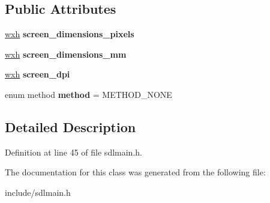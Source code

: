 \subsection*{Public Attributes}
\begin{DoxyCompactItemize}
\item 
\hypertarget{classScreenSizeInfo_ac42ff4475e23dbf92bca2c0ea9d2603b}{\hyperlink{structScreenSizeInfo_1_1wxh}{wxh} {\bfseries screen\-\_\-dimensions\-\_\-pixels}}\label{classScreenSizeInfo_ac42ff4475e23dbf92bca2c0ea9d2603b}

\item 
\hypertarget{classScreenSizeInfo_afe19e45bf6dd0785c5b4bd7db2f57570}{\hyperlink{structScreenSizeInfo_1_1wxh}{wxh} {\bfseries screen\-\_\-dimensions\-\_\-mm}}\label{classScreenSizeInfo_afe19e45bf6dd0785c5b4bd7db2f57570}

\item 
\hypertarget{classScreenSizeInfo_a5e130e26e512ad843178a620246efcde}{\hyperlink{structScreenSizeInfo_1_1wxh}{wxh} {\bfseries screen\-\_\-dpi}}\label{classScreenSizeInfo_a5e130e26e512ad843178a620246efcde}

\item 
\hypertarget{classScreenSizeInfo_a727dd1a26961b8cc5dd3856604c8fa35}{enum method {\bfseries method} = M\-E\-T\-H\-O\-D\-\_\-\-N\-O\-N\-E}\label{classScreenSizeInfo_a727dd1a26961b8cc5dd3856604c8fa35}

\end{DoxyCompactItemize}


\subsection{Detailed Description}


Definition at line 45 of file sdlmain.\-h.



The documentation for this class was generated from the following file\-:\begin{DoxyCompactItemize}
\item 
include/sdlmain.\-h\end{DoxyCompactItemize}
